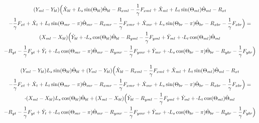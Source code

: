 \documentclass[11pt, landscape]{article}
\newcommand{\mn}{\scalebox{0.7}[1.0]{-}}
\begin{document}
\begin{multline}
(Y_{ml} - Y_{bl})\Big( \dot{X}_{bl} + L_{s}\sin(\Theta_{bl})      \dot{\Theta}_{bl} - R_{xml} - \frac{1}{\gamma}F_{xml} + \dot{X}_{ml} + L_{t}\sin(\Theta_{ml}) \dot{\Theta}_{ml} - R_{xt } \\
- \frac{1}{\gamma}F_{xt } + \dot{X}_{t } + L_{t}\sin(\Theta_{mr}-\pi)  \dot{\Theta}_{mr} - R_{xmr} 
-\frac{1}{\gamma}F_{xmr} + \dot{X}_{mr} + L_{s}\sin(\Theta_{br}-\pi)  \dot{\Theta}_{br} - R_{xbr} - \frac{1}{\gamma}F_{xbr} \Big) = \\
(X_{ml} - X_{bl})\Big( \dot{Y}_{bl} + \mn L_{s}\cos(\Theta_{bl})      \dot{\Theta}_{bl} - R_{yml} - \frac{1}{\gamma}F_{yml} + \dot{Y}_{ml} + \mn L_{t}\cos(\Theta_{ml}) \dot{\Theta}_{ml} \\
- R_{yt} - \frac{1}{\gamma}F_{yt } + \dot{Y}_{t } + \mn L_{t}\cos(\Theta_{mr}-\pi)  \dot{\Theta}_{mr} - R_{ymr} - \frac{1}{\gamma}F_{ymr} + \dot{Y}_{mr}
+ \mn L_{s}\cos(\Theta_{br}-\pi)  \dot{\Theta}_{br} - R_{ybr} - \frac{1}{\gamma}F_{ybr} \Big)
\end{multline}

\begin{multline}
(Y_{ml} - Y_{bl})L_{s}\sin(\Theta_{bl}) \dot{\Theta}_{bl} + (Y_{ml} - Y_{bl})\Big( \dot{X}_{bl} - R_{xml} - \frac{1}{\gamma}F_{xml} + \dot{X}_{ml} + L_{t}\sin(\Theta_{ml}) \dot{\Theta}_{ml} - R_{xt } \\
- \frac{1}{\gamma}F_{xt } + \dot{X}_{t } + L_{t}\sin(\Theta_{mr}-\pi)  \dot{\Theta}_{mr} - R_{xmr} 
-\frac{1}{\gamma}F_{xmr} + \dot{X}_{mr} + L_{s}\sin(\Theta_{br}-\pi)  \dot{\Theta}_{br} - R_{xbr} - \frac{1}{\gamma}F_{xbr} \Big) = \\
\mn (X_{ml} - X_{bl}) L_{s}\cos(\Theta_{bl}) \dot{\Theta}_{bl} + (X_{ml} - X_{bl})\Big( \dot{Y}_{bl} - R_{yml} - \frac{1}{\gamma}F_{yml} + \dot{Y}_{ml} + \mn L_{t}\cos(\Theta_{ml}) \dot{\Theta}_{ml} \\
- R_{yt} - \frac{1}{\gamma}F_{yt } + \dot{Y}_{t } + \mn L_{t}\cos(\Theta_{mr}-\pi)  \dot{\Theta}_{mr} - R_{ymr} - \frac{1}{\gamma}F_{ymr} + \dot{Y}_{mr}
+ \mn L_{s}\cos(\Theta_{br}-\pi)  \dot{\Theta}_{br} - R_{ybr} - \frac{1}{\gamma}F_{ybr} \Big)
\end{multline}
\end{document}
